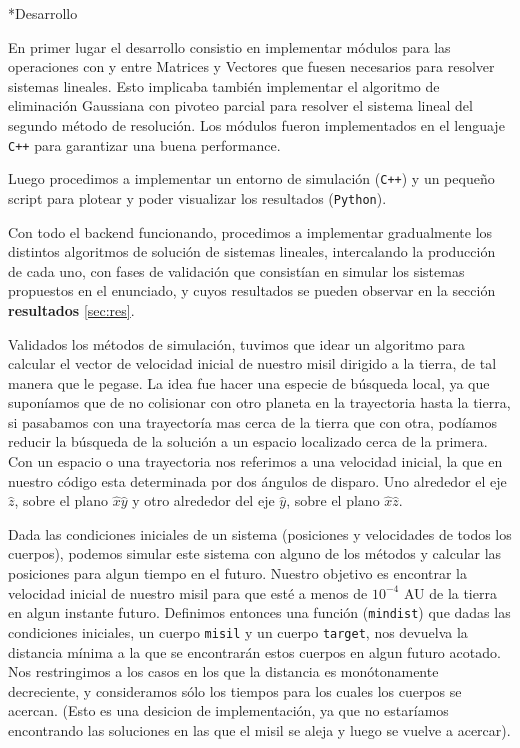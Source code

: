 \documentclass[12pt,titlepage]{article}
\newenvironment{usection}[1]{\newpage\begin{section}*{#1}	\addcontentsline{toc}{section}{#1}}{\end{section}}
\begin{document}
	\begin{usection}{Desarrollo}

		En primer lugar el desarrollo consistio en implementar módulos
		para las operaciones con y entre Matrices y Vectores que
		fuesen necesarios para resolver sistemas lineales. Esto
		implicaba también implementar el algoritmo de eliminación
		Gaussiana con pivoteo parcial para resolver el sistema lineal
		del segundo método de resolución. Los módulos fueron
		implementados en el lenguaje \texttt{C++} para garantizar una
		buena performance.

		Luego procedimos a implementar un entorno de simulación
		(\texttt{C++}) y un pequeño script para plotear y poder
		visualizar los resultados (\texttt{Python}). 

		Con todo el backend funcionando, procedimos a implementar
		gradualmente los distintos algoritmos de solución de sistemas
		lineales, intercalando la producción de cada uno, con fases de
		validación que consistían en simular los sistemas propuestos
		en el enunciado, y cuyos resultados se pueden observar en la
		sección \textbf{resultados} \ref{sec:res}.

		Validados los métodos de simulación, tuvimos que idear un
		algoritmo para calcular el vector de velocidad inicial de
		nuestro misil dirigido a la tierra, de tal manera que le pegase.
		La idea fue hacer una especie de búsqueda local, ya que
		suponíamos que de no colisionar con otro planeta en la
		trayectoria hasta la tierra, si pasabamos con una trayectoría
		mas cerca de la tierra que con otra, podíamos reducir la
		búsqueda de la solución a un espacio localizado cerca de la
		primera. Con un espacio o una trayectoria nos referimos a una
		velocidad inicial, la que en nuestro código esta determinada por
		dos ángulos de disparo. Uno alrededor el eje $\hat{z}$, sobre el
		plano $\hat{x}\hat{y}$ y otro alrededor del eje $\hat{y}$, sobre
		el plano $\hat{x}\hat{z}$.
		
		Dada las condiciones iniciales de un sistema (posiciones y velocidades de todos los cuerpos), podemos simular este sistema con alguno de los métodos y calcular las posiciones para algun tiempo en el futuro.
		Nuestro objetivo es encontrar la velocidad inicial de nuestro misil para que esté a menos de $10^{-4}$ AU de la tierra en algun instante futuro.
		Definimos entonces una función (\texttt{mindist}) que dadas las condiciones iniciales, un cuerpo \texttt{misil} y un cuerpo \texttt{target}, nos devuelva la distancia mínima a la que se encontrarán estos cuerpos en algun futuro acotado.
		Nos restringimos a los casos en los que la distancia es monótonamente decreciente, y consideramos sólo los tiempos para los cuales los cuerpos se acercan. (Esto es una desicion de implementación, ya que no estaríamos encontrando las soluciones en las que el misil se aleja y luego se vuelve a acercar).
		

\end{usection}
\end{document}
